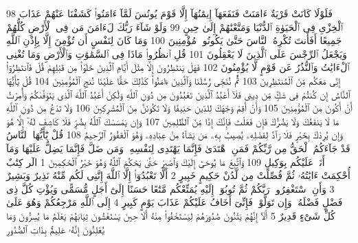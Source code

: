 {\tiny\colorbox{cl_aya}{98}} فَلَوْلَا كَانَتْ قَرْيَةٌ ءَامَنَتْ فَنَفَعَهَآ إِيمَٰنُهَآ إِلَّا قَوْمَ يُونُسَ لَمَّآ ءَامَنُوا۟ كَشَفْنَا عَنْهُمْ عَذَابَ ٱلْخِزْىِ فِى ٱلْحَيَوٰةِ ٱلدُّنْيَا وَمَتَّعْنَٰهُمْ إِلَىٰ حِينٍ
{\tiny\colorbox{cl_aya}{99}} وَلَوْ شَآءَ رَبُّكَ لَءَامَنَ مَن فِى ٱلْأَرْضِ كُلُّهُمْ جَمِيعًا أَفَأَنتَ تُكْرِهُ ٱلنَّاسَ حَتَّىٰ يَكُونُوا۟ مُؤْمِنِينَ
{\tiny\colorbox{cl_aya}{100}} وَمَا كَانَ لِنَفْسٍ أَن تُؤْمِنَ إِلَّا بِإِذْنِ ٱللَّهِ وَيَجْعَلُ ٱلرِّجْسَ عَلَى ٱلَّذِينَ لَا يَعْقِلُونَ
{\tiny\colorbox{cl_aya}{101}} قُلِ ٱنظُرُوا۟ مَاذَا فِى ٱلسَّمَٰوَٰتِ وَٱلْأَرْضِ وَمَا تُغْنِى ٱلْءَايَٰتُ وَٱلنُّذُرُ عَن قَوْمٍ لَّا يُؤْمِنُونَ
{\tiny\colorbox{cl_aya}{102}} فَهَلْ يَنتَظِرُونَ إِلَّا مِثْلَ أَيَّامِ ٱلَّذِينَ خَلَوْا۟ مِن قَبْلِهِمْ قُلْ فَٱنتَظِرُوٓا۟ إِنِّى مَعَكُم مِّنَ ٱلْمُنتَظِرِينَ
{\tiny\colorbox{cl_aya}{103}} ثُمَّ نُنَجِّى رُسُلَنَا وَٱلَّذِينَ ءَامَنُوا۟ كَذَٰلِكَ حَقًّا عَلَيْنَا نُنجِ ٱلْمُؤْمِنِينَ
{\tiny\colorbox{cl_aya}{104}} قُلْ يَٰٓأَيُّهَا ٱلنَّاسُ إِن كُنتُمْ فِى شَكٍّ مِّن دِينِى فَلَآ أَعْبُدُ ٱلَّذِينَ تَعْبُدُونَ مِن دُونِ ٱللَّهِ وَلَٰكِنْ أَعْبُدُ ٱللَّهَ ٱلَّذِى يَتَوَفَّىٰكُمْ وَأُمِرْتُ أَنْ أَكُونَ مِنَ ٱلْمُؤْمِنِينَ
{\tiny\colorbox{cl_aya}{105}} وَأَنْ أَقِمْ وَجْهَكَ لِلدِّينِ حَنِيفًا وَلَا تَكُونَنَّ مِنَ ٱلْمُشْرِكِينَ
{\tiny\colorbox{cl_aya}{106}} وَلَا تَدْعُ مِن دُونِ ٱللَّهِ مَا لَا يَنفَعُكَ وَلَا يَضُرُّكَ فَإِن فَعَلْتَ فَإِنَّكَ إِذًا مِّنَ ٱلظَّٰلِمِينَ
{\tiny\colorbox{cl_aya}{107}} وَإِن يَمْسَسْكَ ٱللَّهُ بِضُرٍّ فَلَا كَاشِفَ لَهُۥٓ إِلَّا هُوَ وَإِن يُرِدْكَ بِخَيْرٍ فَلَا رَآدَّ لِفَضْلِهِۦ يُصِيبُ بِهِۦ مَن يَشَآءُ مِنْ عِبَادِهِۦ وَهُوَ ٱلْغَفُورُ ٱلرَّحِيمُ
{\tiny\colorbox{cl_aya}{108}} قُلْ يَٰٓأَيُّهَا ٱلنَّاسُ قَدْ جَآءَكُمُ ٱلْحَقُّ مِن رَّبِّكُمْ فَمَنِ ٱهْتَدَىٰ فَإِنَّمَا يَهْتَدِى لِنَفْسِهِۦ وَمَن ضَلَّ فَإِنَّمَا يَضِلُّ عَلَيْهَا وَمَآ أَنَا۠ عَلَيْكُم بِوَكِيلٍ
{\tiny\colorbox{cl_aya}{109}} وَٱتَّبِعْ مَا يُوحَىٰٓ إِلَيْكَ وَٱصْبِرْ حَتَّىٰ يَحْكُمَ ٱللَّهُ وَهُوَ خَيْرُ ٱلْحَٰكِمِينَ
{\tiny\colorbox{cl_aya}{1}} الٓر كِتَٰبٌ أُحْكِمَتْ ءَايَٰتُهُۥ ثُمَّ فُصِّلَتْ مِن لَّدُنْ حَكِيمٍ خَبِيرٍ
{\tiny\colorbox{cl_aya}{2}} أَلَّا تَعْبُدُوٓا۟ إِلَّا ٱللَّهَ إِنَّنِى لَكُم مِّنْهُ نَذِيرٌ وَبَشِيرٌ
{\tiny\colorbox{cl_aya}{3}} وَأَنِ ٱسْتَغْفِرُوا۟ رَبَّكُمْ ثُمَّ تُوبُوٓا۟ إِلَيْهِ يُمَتِّعْكُم مَّتَٰعًا حَسَنًا إِلَىٰٓ أَجَلٍ مُّسَمًّى وَيُؤْتِ كُلَّ ذِى فَضْلٍ فَضْلَهُۥ وَإِن تَوَلَّوْا۟ فَإِنِّىٓ أَخَافُ عَلَيْكُمْ عَذَابَ يَوْمٍ كَبِيرٍ
{\tiny\colorbox{cl_aya}{4}} إِلَى ٱللَّهِ مَرْجِعُكُمْ وَهُوَ عَلَىٰ كُلِّ شَىْءٍ قَدِيرٌ
{\tiny\colorbox{cl_aya}{5}} أَلَآ إِنَّهُمْ يَثْنُونَ صُدُورَهُمْ لِيَسْتَخْفُوا۟ مِنْهُ أَلَا حِينَ يَسْتَغْشُونَ ثِيَابَهُمْ يَعْلَمُ مَا يُسِرُّونَ وَمَا يُعْلِنُونَ إِنَّهُۥ عَلِيمٌۢ بِذَاتِ ٱلصُّدُورِ
